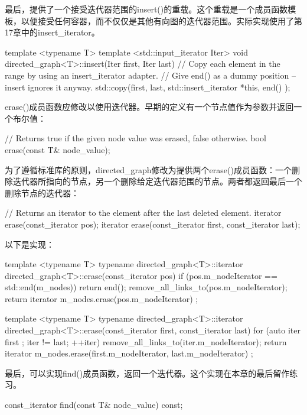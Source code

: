 最后，提供了一个接受迭代器范围的insert()的重载。这个重载是一个成员函数模板，以便接受任何容器，而不仅仅是其他有向图的迭代器范围。实际实现使用了第17章中的insert\_iterator。

\begin{cpp}
template <typename T>
template <std::input_iterator Iter>
void directed_graph<T>::insert(Iter first, Iter last)
{
    // Copy each element in the range by using an insert_iterator adapter.
    // Give end() as a dummy position -- insert ignores it anyway.
    std::copy(first, last, std::insert_iterator { *this, end() });
}
\end{cpp}

erase()成员函数应修改以使用迭代器。早期的定义有一个节点值作为参数并返回一个布尔值：

\begin{cpp}
// Returns true if the given node value was erased, false otherwise.
bool erase(const T& node_value);
\end{cpp}

为了遵循标准库的原则，directed\_graph修改为提供两个erase()成员函数：一个删除迭代器所指向的节点，另一个删除给定迭代器范围的节点。两者都返回最后一个删除节点的迭代器：

\begin{cpp}
// Returns an iterator to the element after the last deleted element.
iterator erase(const_iterator pos);
iterator erase(const_iterator first, const_iterator last);
\end{cpp}

以下是实现：

\begin{cpp}
template <typename T>
typename directed_graph<T>::iterator
    directed_graph<T>::erase(const_iterator pos)
{
    if (pos.m_nodeIterator == std::end(m_nodes)) {
        return end();
    }
    remove_all_links_to(pos.m_nodeIterator);
    return iterator { m_nodes.erase(pos.m_nodeIterator) };
}

template <typename T>
typename directed_graph<T>::iterator
    directed_graph<T>::erase(const_iterator first, const_iterator last)
{
    for (auto iter { first }; iter != last; ++iter) {
        remove_all_links_to(iter.m_nodeIterator);
    }
    return iterator { m_nodes.erase(first.m_nodeIterator, last.m_nodeIterator) };
}
\end{cpp}

最后，可以实现find()成员函数，返回一个迭代器。这个实现在本章的最后留作练习。

\begin{cpp}
const_iterator find(const T& node_value) const;
\end{cpp}

